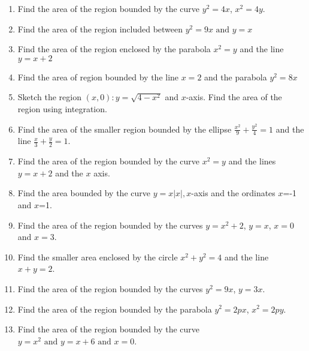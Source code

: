 \begin{enumerate}[label=\thesubsection.\arabic*,ref=\thesubsection.\theenumi]
\item Find the area of the region bounded by the curve $y^2 = 4x$, $x^2 = 4y$.
\item Find the area of the region included between $y^2 = 9x\text{ and }y =x$
\item Find the area of the region enclosed by the parabola $x^2 = y$ and the line $y = x + 2$
\item Find the area of region bounded by the line $x = 2$ and the parabola $y^2 = 8x$
\item Sketch the region ${(x,0) : y = \sqrt{4 - x^2}}$ and $x$-axis. Find the area of the region using integration.
\item 
	Find the area of the smaller region bounded by the ellipse $\frac{x^2}{9}+\frac{y^2}{4}=1$
and the line $\frac{x}{3}+\frac{y}{2}=1$.\\
\solution
\label{chapters/12/8/3/8}

\item 
Find the area of the region bounded by the curve $x^2=y$ and the lines $y=x+2$ and the $x$ axis.
\label{chapters/12/8/3/10}
\item 
Find   the area bounded by the curve $y=x|x|, x$-axis and the ordinates $x$=-1 and $x$=1.
\label{chapters/12/8/3/17}
\item 
	Find the area of the region bounded by the curves $y=x^2+2$, $y=x$, $x=0$ and $x=3. $
\label{chapters/12/8/2/3}
\item 
Find the smaller area enclosed by the circle $x^2 + y^2 = 4$ and the line $x + y = 2$. 
\item Find the area of the region bounded by the curves $y^2 = 9x$, $y = 3x$.
\item Find the area of the region bounded by the parabola $y^2 = 2px$, $x^2 = 2py$.
\item Find the area of the region bounded by the curve $y = x^2\text{ and }y = x + 6\text{ and }x = 0$.
\end{enumerate}
